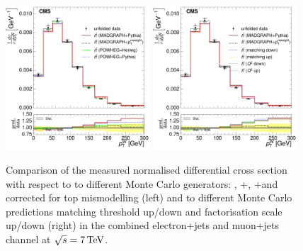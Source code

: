 \begin{figure}[hbtp]
    \centering
     \includegraphics[width=0.48\textwidth]{Chapters/04_Analysis/04b_XSections/images/results/7TeV/WPT/central/normalised_xsection_combined_different_generators.pdf}\hfill
     \includegraphics[width=0.48\textwidth]{Chapters/04_Analysis/04b_XSections/images/results/7TeV/WPT/central/normalised_xsection_combined_systematics_shifts.pdf}\hfill
     \caption{Comparison of the measured normalised differential cross section with respect to \wpt to
     different Monte Carlo generators: \MADGRAPH, \POWHEG+\HERWIG, \POWHEG+\PYTHIA and \MADGRAPH corrected for
     top \pt mismodelling (left) and to different Monte Carlo predictions matching threshold up/down and
     factorisation scale up/down (right) in the combined electron+jets and muon+jets channel at
     $\sqrt{s}=7\,\text{Te\hspace{-.08em}V}$.}
     \label{fig:result_MT_7TeV_combined}
\end{figure}

